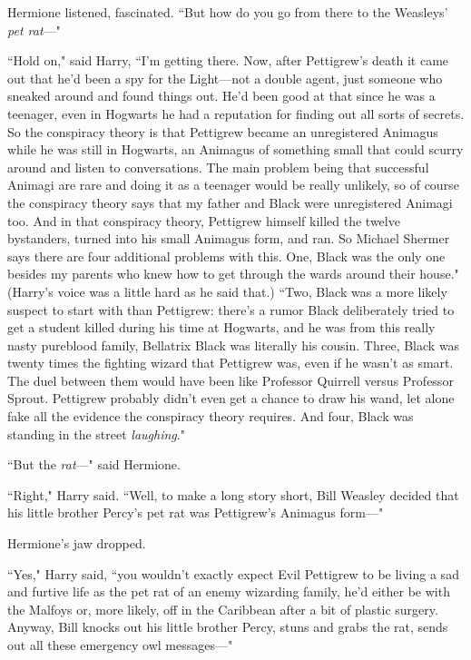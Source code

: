 Hermione listened, fascinated. ``But how do you go from there to the Weasleys' \emph{pet rat}---"

``Hold on," said Harry, ``I'm getting there. Now, after Pettigrew's death it came out that he'd been a spy for the Light---not a double agent, just someone who sneaked around and found things out. He'd been good at that since he was a teenager, even in Hogwarts he had a reputation for finding out all sorts of secrets. So the conspiracy theory is that Pettigrew became an unregistered Animagus while he was still in Hogwarts, an Animagus of something small that could scurry around and listen to conversations. The main problem being that successful Animagi are rare and doing it as a teenager would be really unlikely, so of course the conspiracy theory says that my father and Black were unregistered Animagi too. And in that conspiracy theory, Pettigrew himself killed the twelve bystanders, turned into his small Animagus form, and ran. So Michael Shermer says there are four additional problems with this. One, Black was the only one besides my parents who knew how to get through the wards around their house." (Harry's voice was a little hard as he said that.) ``Two, Black was a more likely suspect to start with than Pettigrew: there's a rumor Black deliberately tried to get a student killed during his time at Hogwarts, and he was from this really nasty pureblood family, Bellatrix Black was literally his cousin. Three, Black was twenty times the fighting wizard that Pettigrew was, even if he wasn't as smart. The duel between them would have been like Professor Quirrell versus Professor Sprout. Pettigrew probably didn't even get a chance to draw his wand, let alone fake all the evidence the conspiracy theory requires. And four, Black was standing in the street \emph{laughing}."

``But the \emph{rat}---" said Hermione.

``Right," Harry said. ``Well, to make a long story short, Bill Weasley decided that his little brother Percy's pet rat was Pettigrew's Animagus form---"

Hermione's jaw dropped.

``Yes," Harry said, ``you wouldn't exactly expect Evil Pettigrew to be living a sad and furtive life as the pet rat of an enemy wizarding family, he'd either be with the Malfoys or, more likely, off in the Caribbean after a bit of plastic surgery. Anyway, Bill knocks out his little brother Percy, stuns and grabs the rat, sends out all these emergency owl messages---"

